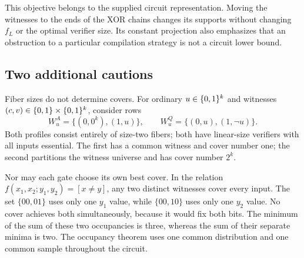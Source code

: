 This objective belongs to the supplied circuit representation. Moving
the witnesses to the ends of the XOR chains changes its supports
without changing $f_L$ or the optimal verifier size. Its constant
projection also emphasizes that an obstruction to a particular
compilation strategy is not a circuit lower bound.

\subsection{Two additional cautions}

Fiber sizes do not determine covers. For ordinary $u\in\{0,1\}^k$ and
witnesses $(c,v)\in\{0,1\}\times\{0,1\}^k$, consider rows
\[
 W^A_u=\{(0,0^k),(1,u)\},\qquad
 W^Q_u=\{(0,u),(1,\neg u)\}.
\]
Both profiles consist entirely of size-two fibers; both have linear-size
verifiers with all inputs essential. The first has a common witness
and cover number one; the second partitions the witness universe
and has cover number $2^k$.

Nor may each gate choose its own best cover. In the relation
$f(x_1,x_2;y_1,y_2)=[x\ne y]$, any two distinct witnesses cover every
input. The set $\{00,01\}$ uses only one $y_1$ value, while
$\{00,10\}$ uses only one $y_2$ value. No cover achieves both
simultaneously, because it would fix both bits. The minimum of the
sum of these two occupancies is three, whereas the sum of their
separate minima is two. The occupancy theorem uses one common
distribution and one common sample throughout the circuit.
